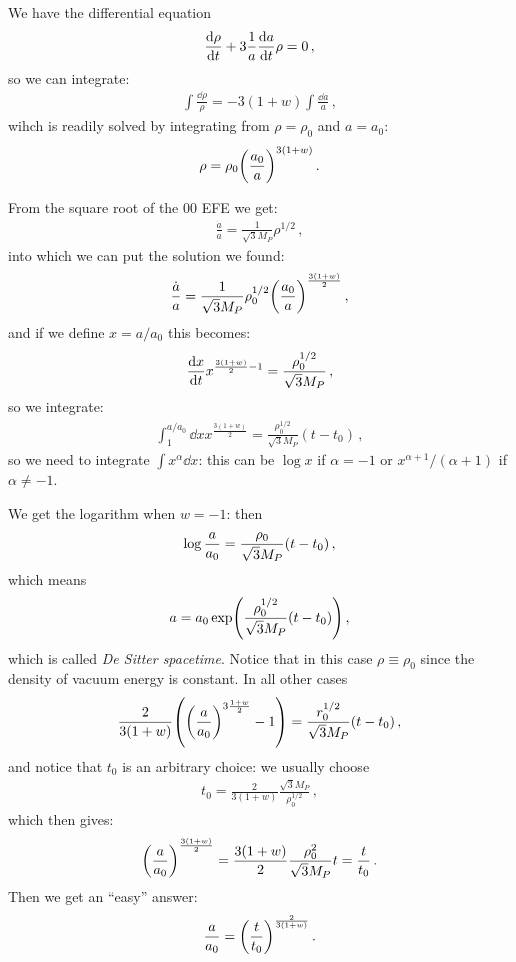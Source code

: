 \documentclass[main.tex]{subfiles}
\begin{document}
We have the differential equation 
%
\begin{align}
\dv{\rho }{t} + 3 \frac{1}{a} \dv{a}{t} (1+w)\rho =0
\,,
\end{align}
%
so we can integrate: 
%
\begin{align}
\int \frac{ \dd{\rho }}{\rho } = - 3 (1+w) \int \frac{ \dd{a}}{a}
\,,
\end{align}
%
wihch is readily solved by integrating from \(\rho =\rho_0 \) and \(a=a_0 \):
%
\begin{align}
\rho = \rho_0 \qty(\frac{a_0 }{a})^{3 (1+w)}
\,.
\end{align}
%

From the square root of the 00 EFE we get: 
%
\begin{align}
\frac{\dot{a}}{a} = \frac{1}{\sqrt{3}M_P} \rho^{1/2}
\,,
\end{align}
%
into which we can put the solution we found: 
%
\begin{align}
\frac{\dot{a}}{a} = \frac{1}{\sqrt{3}M_P} \rho_0^{1/2} \qty(\frac{a_0 }{a})^{\frac{3(1+w)}{2}}
\,,
\end{align}
%
and if we define \(x = a / a_0 \) this becomes: 
%
\begin{align}
\dv{x}{t} x^{\frac{3(1+w)}{2} - 1} = \frac{\rho_0 ^{1/2}}{\sqrt{3}M_P}
\,,
\end{align}
%
so we integrate: 
%
\begin{align}
\int_{1}^{a / a_0 } \dd{x} x^{\frac{3(1+w)}{2}} = 
\frac{\rho_0^{1/2}}{\sqrt{3}M_P} (t-t_0 )
\,,
\end{align}
%
so we need to integrate \(\int x^{\alpha } \dd{x}\): this can be \(\log x\) if \(\alpha = -1\) or \(x^{\alpha +1} / (\alpha +1)\) if \(\alpha \neq -1\). 

We get the logarithm when \(w = -1\): then 
%
\begin{align}
\log \frac{a}{a_0 }  = \frac{\rho_0}{\sqrt{3}M_P} \qty(t - t_0 )
\,,
\end{align}
%
which means 
%
\begin{align}
a = a_0 \exp(\frac{\rho_0^{1/2}}{\sqrt{3}M_P} \qty(t - t_0 ))
\,,
\end{align}
%
which is called \emph{De Sitter spacetime}. Notice that in this case \(\rho \equiv \rho_0 \) since the density of vacuum energy is constant. In all other cases 
%
\begin{align}
\frac{2}{3 (1+w)} \qty(\qty(\frac{a}{a_0 })^{3\frac{1+w}{2}} -1) = \frac{r_0^{1/2}}{\sqrt{3}M_P} \qty(t - t_0 )
\,,
\end{align}
%
and notice that \(t_0 \) is an arbitrary choice: we usually choose 
%
\begin{align}
t_0 = \frac{2}{3 (1+w)} \frac{\sqrt{3}M_P}{\rho_0^{1/2}}
\,,
\end{align}
%
which then gives: 
%
\begin{align}
\qty(\frac{a}{a_0 })^{\frac{3 (1+w)}{2}} = \frac{3 (1+w)}{2} \frac{\rho_0^2 }{\sqrt{3}M_P} t = \frac{t}{t_0 }
\,.
\end{align}
%
Then we get an ``easy'' answer: 
%
\begin{align}
\frac{a}{a_0 } = \qty(\frac{t}{t_0 })^{\frac{2}{3 (1+w)}} 
\,.
\end{align}
\end{document}
